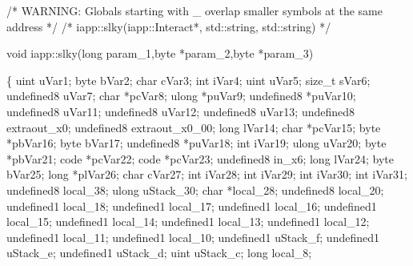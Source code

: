 \documentclass[
]{article}
\newenvironment{Shaded}{}{}
\newcommand{\NormalTok}[1]{#1}
\begin{document}
\begin{Shaded}
\begin{Highlighting}[]

\NormalTok{/* WARNING: Globals starting with \textquotesingle{}\_\textquotesingle{} overlap smaller symbols at the same address */}
\NormalTok{/* iapp::slky(iapp::Interact*, std::string, std::string) */}

\NormalTok{void iapp::slky(long param\_1,byte *param\_2,byte *param\_3)}

\NormalTok{\{}
\NormalTok{  uint uVar1;}
\NormalTok{  byte bVar2;}
\NormalTok{  char cVar3;}
\NormalTok{  int iVar4;}
\NormalTok{  uint uVar5;}
\NormalTok{  size\_t sVar6;}
\NormalTok{  undefined8 uVar7;}
\NormalTok{  char *pcVar8;}
\NormalTok{  ulong *puVar9;}
\NormalTok{  undefined8 *puVar10;}
\NormalTok{  undefined8 uVar11;}
\NormalTok{  undefined8 uVar12;}
\NormalTok{  undefined8 uVar13;}
\NormalTok{  undefined8 extraout\_x0;}
\NormalTok{  undefined8 extraout\_x0\_00;}
\NormalTok{  long lVar14;}
\NormalTok{  char *pcVar15;}
\NormalTok{  byte *pbVar16;}
\NormalTok{  byte bVar17;}
\NormalTok{  undefined8 *puVar18;}
\NormalTok{  int iVar19;}
\NormalTok{  ulong uVar20;}
\NormalTok{  byte *pbVar21;}
\NormalTok{  code *pcVar22;}
\NormalTok{  code *pcVar23;}
\NormalTok{  undefined8 in\_x6;}
\NormalTok{  long lVar24;}
\NormalTok{  byte bVar25;}
\NormalTok{  long *plVar26;}
\NormalTok{  char cVar27;}
\NormalTok{  int iVar28;}
\NormalTok{  int iVar29;}
\NormalTok{  int iVar30;}
\NormalTok{  int iVar31;}
\NormalTok{  undefined8 local\_38;}
\NormalTok{  ulong uStack\_30;}
\NormalTok{  char *local\_28;}
\NormalTok{  undefined8 local\_20;}
\NormalTok{  undefined1 local\_18;}
\NormalTok{  undefined1 local\_17;}
\NormalTok{  undefined1 local\_16;}
\NormalTok{  undefined1 local\_15;}
\NormalTok{  undefined1 local\_14;}
\NormalTok{  undefined1 local\_13;}
\NormalTok{  undefined1 local\_12;}
\NormalTok{  undefined1 local\_11;}
\NormalTok{  undefined1 local\_10;}
\NormalTok{  undefined1 uStack\_f;}
\NormalTok{  undefined1 uStack\_e;}
\NormalTok{  undefined1 uStack\_d;}
\NormalTok{  uint uStack\_c;}
\NormalTok{  long local\_8;}
  

\end{Highlighting}
\end{Shaded}
\end{document}
